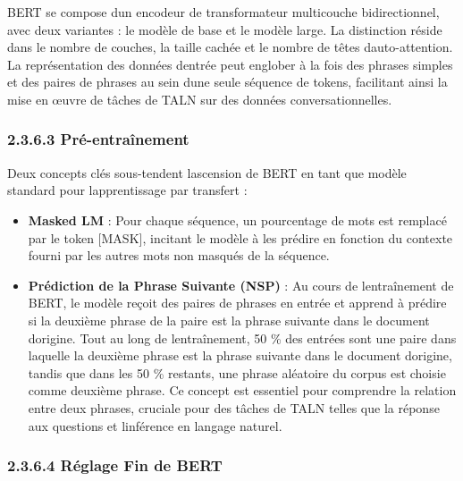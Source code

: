 \documentclass[
]{article}
\begin{document}
BERT se compose d\textquotesingle un encodeur de transformateur
multicouche bidirectionnel, avec deux variantes : le modèle de base et
le modèle large. La distinction réside dans le nombre de couches, la
taille cachée et le nombre de têtes d\textquotesingle auto-attention. La
représentation des données d\textquotesingle entrée peut englober à la
fois des phrases simples et des paires de phrases au sein
d\textquotesingle une seule séquence de tokens, facilitant ainsi la mise
en œuvre de tâches de TALN sur des données conversationnelles.

\subsubsection{\texorpdfstring{2.3.6.3 Pré-entraînement
}{2.3.6.3 Pré-entraînement }}\label{pruxe9-entrauxeenement}

Deux concepts clés sous-tendent l\textquotesingle ascension de BERT en
tant que modèle standard pour l\textquotesingle apprentissage par
transfert :

\begin{itemize}
\item
  \textbf{Masked LM} : Pour chaque séquence, un pourcentage de mots est
  remplacé par le token {[}MASK{]}, incitant le modèle à les prédire en
  fonction du contexte fourni par les autres mots non masqués de la
  séquence.
\item
  \textbf{Prédiction de la Phrase Suivante (NSP)} : Au cours de
  l\textquotesingle entraînement de BERT, le modèle reçoit des paires de
  phrases en entrée et apprend à prédire si la deuxième phrase de la
  paire est la phrase suivante dans le document
  d\textquotesingle origine. Tout au long de
  l\textquotesingle entraînement, 50 \% des entrées sont une paire dans
  laquelle la deuxième phrase est la phrase suivante dans le document
  d\textquotesingle origine, tandis que dans les 50 \% restants, une
  phrase aléatoire du corpus est choisie comme deuxième phrase. Ce
  concept est essentiel pour comprendre la relation entre deux phrases,
  cruciale pour des tâches de TALN telles que la réponse aux questions
  et l\textquotesingle inférence en langage naturel.
\end{itemize}

\subsubsection{\texorpdfstring{2.3.6.4 Réglage Fin de BERT
}{2.3.6.4 Réglage Fin de BERT }}\label{ruxe9glage-fin-de-bert}
\end{document}
